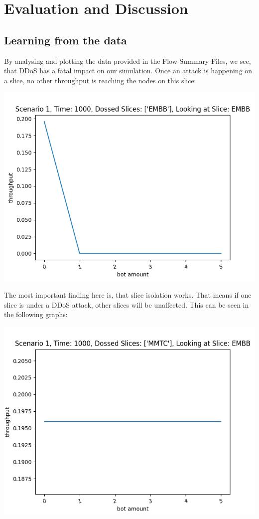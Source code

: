 
\chapter{Evaluation and Discussion}
\label{chapter:evaluation}
\section{Learning from the data}

	By analysing and plotting the data provided in the Flow Summary Files, we see, that DDoS has a fatal impact on our simulation. Once an attack is happening on a slice, no other throughput is reaching the nodes on this slice:
	
	\includegraphics[width=\textwidth]{img/slice_dos_works.png}

    The most important finding here is, that slice isolation works. That means if one slice is under a DDoS attack, other slices will be unaffected. This can be seen in the following graphs:
    
    \includegraphics[width=\textwidth]{img/slice_isolation_works_single.png}
    
